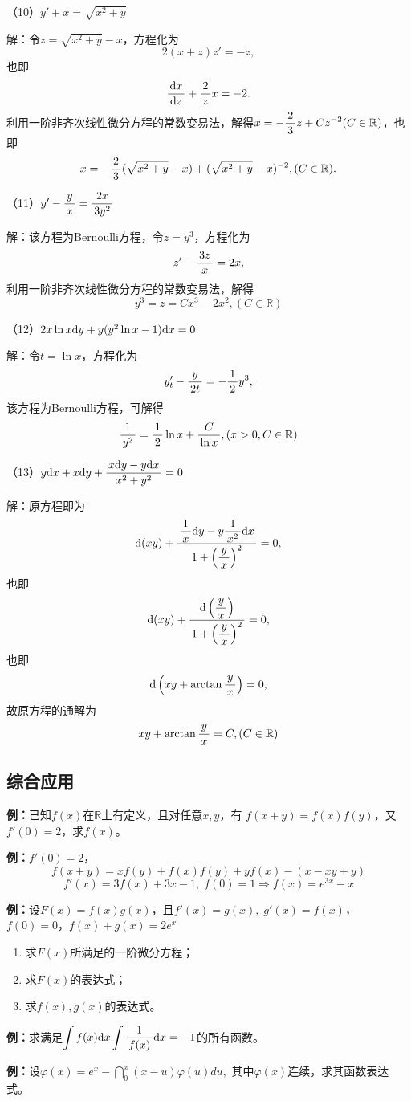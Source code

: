 （10）$y'+x=\sqrt{x^2+y}$

解：令$z=\sqrt{x^2+y}-x$，方程化为
$$2(x+z)z'=-z,$$
也即
$$\df{\d x}{\d z}+\df2zx=-2.$$
利用一阶非齐次线性微分方程的常数变易法，解得$x=-\df23z+Cz^{-2}(C\in\mathbb{R})$，也即
$$x=-\df23(\sqrt{x^2+y}-x)+(\sqrt{x^2+y}-x)^{-2},(C\in\mathbb{R}).$$

（11）$y'-\df yx=\df{2x}{3y^2}$

解：该方程为Bernoulli方程，令$z=y^3$，方程化为
$$z'-\df{3z}x=2x,$$
利用一阶非齐次线性微分方程的常数变易法，解得
$$y^3=z=Cx^3-2x^2,(C\in\mathbb{R})$$

（12）$2x\ln x\d y+y(y^2\ln x-1)\d x=0$

解：令$t=\ln x$，方程化为
$$y'_t-\df y{2t}=-\df12y^3,$$
该方程为Bernoulli方程，可解得
$$\df1{y^2}=\df12\ln x+\df C{\ln x},(x>0,C\in\mathbb{R})$$

（13）$y\d x+x\d y+\df{x\d y-y\d x}{x^2+y^2}=0$

解：原方程即为
$$\d(xy)+\df{\df1x\d y-y\df1{x^2}\d x}{1+\left(\df yx\right)^2}=0,$$
也即
$$\d(xy)+\df{\d\left(\df yx\right)}{1+\left(\df yx\right)^2}=0,$$
也即
$$\d\left(xy+\arctan\df yx\right)=0,$$
故原方程的通解为
$$xy+\arctan\df yx=C,(C\in\mathbb{R})$$

\subsection{综合应用}

{\bf 例：}已知$f(x)$在$\mathbb{R}$上有定义，且对任意$x,y$，有
$f(x+y)=f(x)f(y)$，又$f'(0)=2$，求$f(x)$。

{\bf 例：}$f'(0)=2$，
$$f(x+y)=xf(y)+f(x)f(y)+yf(x)-(x-xy+y)$$
$$f'(x)=3f(x)+3x-1,\;f(0)=1\Rightarrow f(x)=e^{3x}-x$$

{\bf 例：}设$F(x)=f(x)g(x)$，且$f'(x)=g(x),\;g'(x)=f(x)$，
$f(0)=0$，$f(x)+g(x)=2e^x$
\begin{enumerate}[(1)]
  \setlength{\itemindent}{1cm}
  \item 求$F(x)$所满足的一阶微分方程；
  \item 求$F(x)$的表达式；
  \item 求$f(x),g(x)$的表达式。
\end{enumerate}

{\bf 例：}求满足$\dint f(x)\d x\dint\df1{f(x)}\d x=-1$的所有函数。

{\bf 例：}设$\varphi(x)=e^x-\dint_0^x(x-u)\varphi(u)du,$
其中$\varphi(x)$连续，求其函数表达式。

